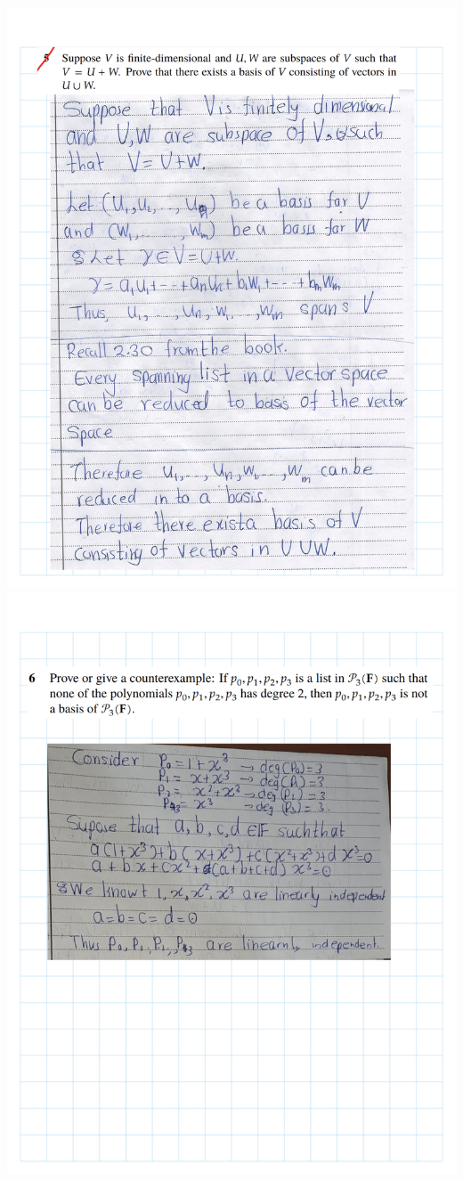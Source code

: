 \documentclass[
]{book}
\theoremstyle{definition}
\theoremstyle{definition}
\theoremstyle{definition}
\theoremstyle{definition}
\theoremstyle{remark}
\begin{document}
\includegraphics{fig/Ex 2B and 2C/EX2B (13).png}
\includegraphics{fig/Ex 2B and 2C/EX2B (14).png}
\end{document}

